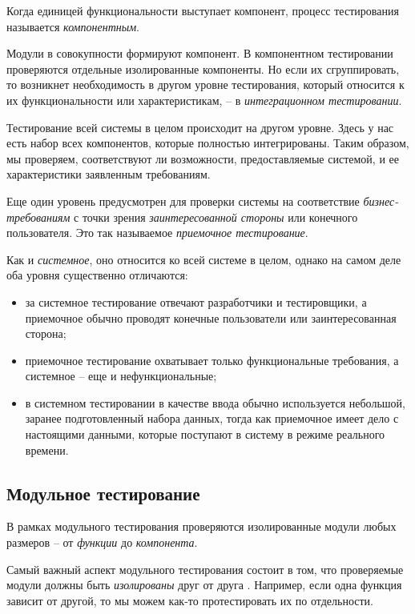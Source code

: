 \documentclass[%
	11pt,
	a4paper,
	utf8,
		]{article}
\begin{document}
Когда единицей функциональности выступает компонент, процесс тестирования называется \emph{компонентным}.

Модули в совокупности формируют компонент. В компонентном тестировании проверяются отдельные изолированные компоненты. Но если их сгруппировать, то возникнет необходимость в другом уровне тестирования, который относится к их функциональности или характеристикам, -- в \emph{интеграционном тестировании}.

Тестирование всей системы в целом происходит на другом уровне. Здесь у нас есть набор всех компонентов, которые полностью интегрированы. Таким образом, мы проверяем, соответствуют ли возможности, предоставляемые системой, и ее характеристики заявленным требованиям.

Еще один уровень предусмотрен для проверки системы на соответствие \emph{бизнес-требованиям} с точки зрения \emph{заинтересованной стороны} или конечного пользователя. Это так называемое \emph{приемочное тестирование}.

Как и \emph{системное}, оно относится ко всей системе в целом, однако на самом деле оба уровня существенно отличаются:
\begin{itemize}
	\item за системное тестирование отвечают разработчики и тестировщики, а приемочное обычно проводят конечные пользователи или заинтересованная сторона;
	
	\item приемочное тестирование охватывает только функциональные требования, а системное -- еще и нефункциональные;
	
	\item в системном тестировании в качестве ввода обычно используется небольшой, заранее подготовленный набора данных, тогда как приемочное имеет дело с настоящими данными, которые поступают в систему в режиме реального времени.
\end{itemize}

\subsection{Модульное тестирование}

В рамках модульного тестирования проверяются изолированные модули любых размеров -- от \emph{функции} до \emph{компонента}.

Самый важный аспект модульного тестирования состоит в том, что проверяемые модули должны быть \emph{изолированы} друг от друга \cite[]{amini-extreme-c:2022}. Например, если одна функция зависит от другой, то мы можем как-то протестировать их по отдельности.
\end{document}
